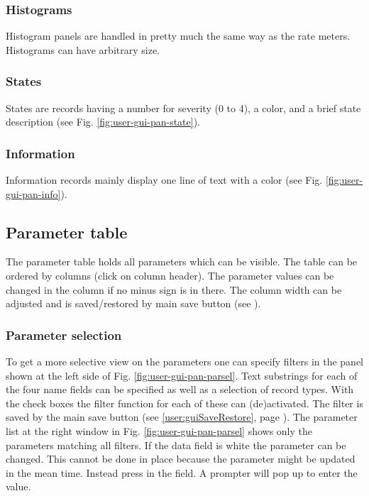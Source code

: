 {\subsubsection{Histograms}
Histogram panels are handled in pretty much the same way as the rate meters.
Histograms can have arbitrary size.
\subsubsection{States}
States are records having a number for severity (0 to 4), a color,
and a brief state description (see Fig. \ref{fig:user-gui-pan-state}).
\subsubsection{Information}
Information records mainly display one line of text with a color
(see Fig. \ref{fig:user-gui-pan-info}).
\subsection{Parameter table}
The parameter table holds all parameters which can be visible.
The table can be ordered by columns (click on column header). 
The parameter values can be changed
in the  column if no minus sign is in there.
The column width can be adjusted and is saved/restored by main save button
(see ).
\subsubsection{Parameter selection}
To get a more selective view on the parameters one can specify
filters in the panel shown at the left side of Fig. \ref{fig:user-gui-pan-parsel}. 
Text substrings for each of the four name fields
can be specified as well as a selection of record types.
With the check boxes the filter function for each of these can (de)activated.
The filter is saved by the main save button
(see \ref{user:guiSaveRestore}, page \pageref{user:guiSaveRestore}).
The parameter list at the right window in Fig. \ref{fig:user-gui-pan-parsel}
shows only the parameters matching all filters.
If the data field is white the parameter can be changed.
This cannot be done in place because the parameter might be
updated in the mean time. Instead press  in the field.
A prompter will pop up to enter the value.
}
